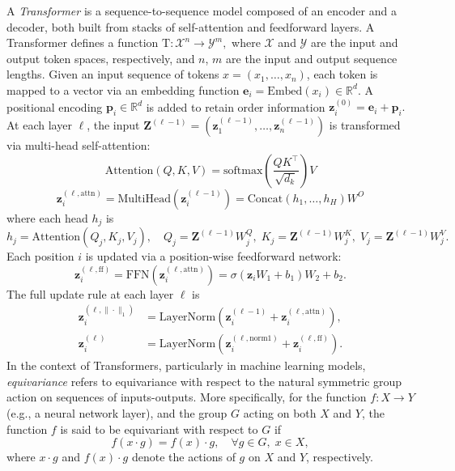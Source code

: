 \documentclass[a4paper,12pt,reqno]{amsart}
\theoremstyle{definition}
\theoremstyle{remark}
\begin{document}
A \textit{Transformer} is a sequence-to-sequence model composed of an encoder and a decoder, both built from stacks of self-attention and feedforward layers. A Transformer defines a function
\(
\mathrm{T}: \mathcal{X}^n \rightarrow \mathcal{Y}^m, 
\)
where \( \mathcal{X} \) and \( \mathcal{Y} \) are the input and output token spaces, respectively, and \( n \), \( m \) are the input and output sequence lengths. Given an input sequence of tokens \( x = (x_1, \dots, x_n) \), each token is mapped to a vector via an embedding function
\(
\mathbf{e}_i = \mathrm{Embed}(x_i) \in \mathbb{R}^d. 
\)
A positional encoding \( \mathbf{p}_i \in \mathbb{R}^d \) is added to retain order information
\(
\mathbf{z}_i^{(0)} = \mathbf{e}_i + \mathbf{p}_i.
\)
At each layer \( \ell \), the input \( \mathbf{Z}^{(\ell-1)} = (\mathbf{z}_1^{(\ell-1)}, \dots, \mathbf{z}_n^{(\ell-1)}) \) is transformed via multi-head self-attention:
\[
\mathrm{Attention}(Q, K, V) = \mathrm{softmax}\left( \frac{QK^\top}{\sqrt{d_k}} \right)V
\]
\[
\mathbf{z}_i^{(\ell,\text{attn})} = \mathrm{MultiHead}(\mathbf{z}_i^{(\ell-1)}) = \mathrm{Concat}(h_1, \dots, h_H)W^O
\]
where each head \( h_j \) is
\[
h_j = \mathrm{Attention}(Q_j, K_j, V_j), \quad Q_j = \mathbf{Z}^{(\ell-1)} W_j^Q, \; K_j = \mathbf{Z}^{(\ell-1)} W_j^K, \; V_j = \mathbf{Z}^{(\ell-1)} W_j^V.
\]
Each position \( i \) is updated via a position-wise feedforward network:
\[
\mathbf{z}_i^{(\ell,\text{ff})} = \mathrm{FFN}(\mathbf{z}_i^{(\ell,\text{attn})}) = \sigma(\mathbf{z}_i W_1 + b_1) W_2 + b_2.
\]
The full update rule at each layer \( \ell \) is
\begin{align*}
\mathbf{z}_i^{(\ell,\|\cdot\|_1)} &= \mathrm{LayerNorm}(\mathbf{z}_i^{(\ell-1)} + \mathbf{z}_i^{(\ell,\text{attn})}),\\
\mathbf{z}_i^{(\ell)} &= \mathrm{LayerNorm}(\mathbf{z}_i^{(\ell,\text{norm1})} + \mathbf{z}_i^{(\ell,\text{ff})}).
\end{align*}
In the context of Transformers, particularly in machine learning models, \textit{equivariance} refers to equivariance with respect to the natural symmetric group action on sequences of inputs-outputs. More specifically, for the function \( f: X \to Y \) (e.g., a neural network layer), and the group \( G \) acting on both \( X \) and \( Y \), the function \( f \) is said to be equivariant with respect to \( G \) if
\[
f(x \cdot g) = f(x) \cdot g, \quad \forall g \in G, \; x \in X,
\]
where \( x \cdot g \) and \( f(x) \cdot g \) denote the actions of \( g \) on \( X \) and \( Y \), respectively.
\end{document}
